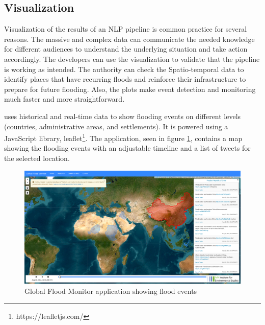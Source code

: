 
\subsection{Visualization}
Visualization of the results of an \ac{NLP} pipeline is common practice for several reasons. The
massive and complex data can communicate the needed knowledge for different audiences to understand
the underlying situation and take action accordingly. The developers can use the visualization to
validate that the pipeline is working as intended. The authority can check the Spatio-temporal data
to identify places that have recurring floods and reinforce their infrastructure to prepare for
future flooding. Also, the plots make event detection and monitoring much faster and more
straightforward.

 uses historical and real-time data to show flooding
events on different levels (countries, administrative areas, and settlements). It is powered using a
JavaScript library, leaflet\footnote{https://leafletjs.com/}. The application, seen in figure
\ref{fig:global}, contains a map showing the flooding events with an adjustable timeline and a list
of tweets for the selected location.


\begin{figure}[H]
\begin{center}
  \includegraphics[width=\columnwidth]{images/global.png}
\end{center}
\caption{Global Flood Monitor application showing flood events}
\label{fig:global}
\end{figure}

